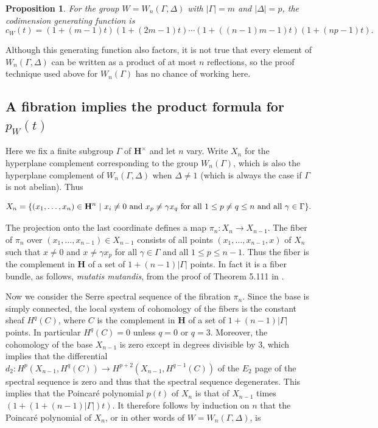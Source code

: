 \documentclass[11pt, reqno]{amsart}
\numberwithin{equation}{section}
\theoremstyle{definition}
\theoremstyle{plain}
\newtheorem{proposition}[theorem]{Proposition}
\newcommand{\HH}{\mathbf{H}}
\begin{document}
\begin{proposition}
For the group $W=W_n(\Gamma,\Delta)$ with $|\Gamma|=m$ and $|\Delta|=p$, the codimension generating function is 
$$c_W(t)=(1+(m-1)t)(1+(2m-1)t)\cdots(1+((n-1)m-1)t) (1+(np-1)t).$$
\end{proposition} Although this generating function also factors, it is not true that every element of $W_n(\Gamma,\Delta)$ can be written as a product of at most $n$ reflections, so the proof technique used above for $W_n(\Gamma)$ has no chance of working here.

\subsection{A fibration implies the product formula for $p_W(t)$} Here we fix a finite subgroup $\Gamma$ of $\HH^\times$ and let $n$ vary. Write $X_n$ for the hyperplane complement corresponding to the group $W_n(\Gamma)$, which is also the hyperplane complement of $W_n(\Gamma,\Delta)$ when $\Delta \neq 1$ (which is always the case if $\Gamma$ is not abelian). Thus 

$$X_n=\{(x_1,\dots,x_n) \in \HH^n \ | \ x_i \neq 0 \ \text{and} \ x_p \neq \gamma x_q \ \hbox{for all $1 \leq p \neq q \leq n$ and all $\gamma \in \Gamma$} \}.$$

The projection onto the last coordinate defines a map $\pi_n:X_n \to X_{n-1}$. The fiber of $\pi_n$ over $(x_1,\dots,x_{n-1}) \in X_{n-1}$ consists of all points $(x_1,\dots,x_{n-1},x)$ of $X_n$ such that $x \neq 0$ and $x \neq \gamma x_p$ for all $\gamma \in \Gamma$ and all $1 \leq p \leq n-1$. Thus the fiber is the complement in $\HH$ of a set of $1+(n-1)|\Gamma|$ points. In fact it is a fiber bundle, as follows, \emph{mutatis mutandis}, from the proof of Theorem 5.111 in \cite{OrTe}. 

Now we consider the Serre spectral sequence of the fibration $\pi_n$. Since the base is simply connected, the local system of cohomology of the fibers is the constant sheaf $H^q(C)$, where $C$ is the complement in $\HH$ of a set of $1+(n-1)|\Gamma|$ points. In particular $H^q(C)=0$ unless $q=0$ or $q=3$. Moreover, the cohomology of the base $X_{n-1}$ is zero except in degrees divisible by $3$, which implies that the differential $d_2:H^p(X_{n-1},H^q(C)) \to H^{p+2}(X_{n-1},H^{q-1}(C))$ of the $E_2$ page of the spectral sequence is zero and thus that the spectral sequence degenerates. This implies that the Poincar\'e polynomial $p(t)$ of $X_n$ is that of $X_{n-1}$ times $(1+(1+(n-1)|\Gamma|) t)$. It therefore follows by induction on $n$ that the Poincar\'e polynomial of $X_n$, or in other words of $W=W_n(\Gamma,\Delta)$, is 
\end{document}
